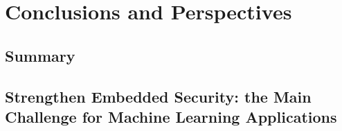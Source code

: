 
\chapter{Conclusions and Perspectives} %

\label{ChapterConclusions}


\section{Summary}


\section{Strengthen Embedded Security: the Main Challenge for Machine Learning Applications}

